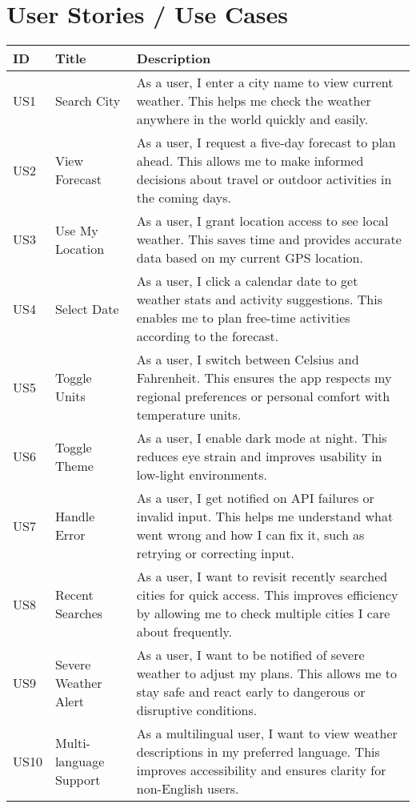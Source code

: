 \documentclass[fontsize=13pt,a4paper]{scrartcl}
\begin{document}
\section{User Stories / Use Cases}
\begin{longtable}{|p{1cm}|p{3cm}|p{10cm}|}
\hline
\textbf{ID} & \textbf{Title} & \textbf{Description} \\
\hline
US1 & Search City & As a user, I enter a city name to view current weather. This helps me check the weather anywhere in the world quickly and easily. \\
\hline
US2 & View Forecast & As a user, I request a five-day forecast to plan ahead. This allows me to make informed decisions about travel or outdoor activities in the coming days. \\
\hline
US3 & Use My Location & As a user, I grant location access to see local weather. This saves time and provides accurate data based on my current GPS location. \\
\hline
US4 & Select Date & As a user, I click a calendar date to get weather stats and activity suggestions. This enables me to plan free-time activities according to the forecast. \\
\hline
US5 & Toggle Units & As a user, I switch between Celsius and Fahrenheit. This ensures the app respects my regional preferences or personal comfort with temperature units. \\
\hline
US6 & Toggle Theme & As a user, I enable dark mode at night. This reduces eye strain and improves usability in low-light environments. \\
\hline
US7 & Handle Error & As a user, I get notified on API failures or invalid input. This helps me understand what went wrong and how I can fix it, such as retrying or correcting input. \\
\hline
US8 & Recent Searches & As a user, I want to revisit recently searched cities for quick access. This improves efficiency by allowing me to check multiple cities I care about frequently. \\
\hline
US9 & Severe Weather Alert & As a user, I want to be notified of severe weather to adjust my plans. This allows me to stay safe and react early to dangerous or disruptive conditions. \\
\hline
US10 & Multi-language Support & As a multilingual user, I want to view weather descriptions in my preferred language. This improves accessibility and ensures clarity for non-English users. \\
\hline
\end{longtable}
\end{document}

